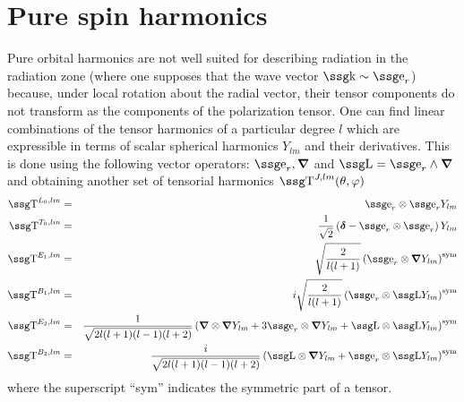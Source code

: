 \section{Pure spin harmonics}

Pure orbital harmonics are not well suited for describing radiation in
the radiation zone (where one supposes that the wave vector $\w{k}
\sim \w{e}_r$) because, under local rotation about the radial vector,
their tensor components do not transform as the components of the
polarization tensor. One can find linear combinations of the tensor
harmonics of a particular degree $l$ which are expressible in terms of
scalar spherical harmonics $Y_{lm}$ and their derivatives. This is
done using the following vector operators: $\w{e}_r, \wg{\nabla}$ and
$\w{L} = \w{e}_r \wedge \wg{\nabla}$ and obtaining another set of tensorial
harmonics $\w{T}^{J, lm}(\th,\ph )$
\begin{eqnarray}
\w{T}^{L_0, lm} &=& \w{e}_r \otimes \w{e}_r Y_{lm} \nonumber\\
\w{T}^{T_0, lm} &=& \frac{1}{\sqrt{2}} \left( \wg{\delta} -  \w{e}_r
\otimes \w{e}_r  \right) Y_{lm} \nonumber\\
\w{T}^{E_1, lm} &=& \sqrt{\frac{2}{l(l+1)}} \left( \w{e}_r \otimes
\wg{\nabla} Y_{lm} \right)^{\rm sym} \nonumber\\
\w{T}^{B_1, lm} &=& i\sqrt{\frac{2}{l(l+1)}} \left( \w{e}_r \otimes
\w{L} Y_{lm} \right)^{\rm sym} \nonumber\\
\w{T}^{E_2, lm} &=& \frac{1}{\sqrt{2l(l+1)(l-1)(l+2)}} \left(
\wg{\nabla} \otimes \wg{\nabla} Y_{lm} + 3 \w{e}_r \otimes \wg{\nabla}
Y_{lm} + \w{L} \otimes \w{L} Y_{lm} \right)^{\rm sym}  \nonumber\\
\w{T}^{B_2, lm} &=& \frac{i}{\sqrt{2l(l+1)(l-1)(l+2)}} \left(
\w{L} \otimes \wg{\nabla} Y_{lm} + \w{e}_r \otimes \w{L}
Y_{lm} \right)^{\rm sym} \label{e:zeril1}
\end{eqnarray}
where the superscript ``sym'' indicates the symmetric part of a
tensor. 

